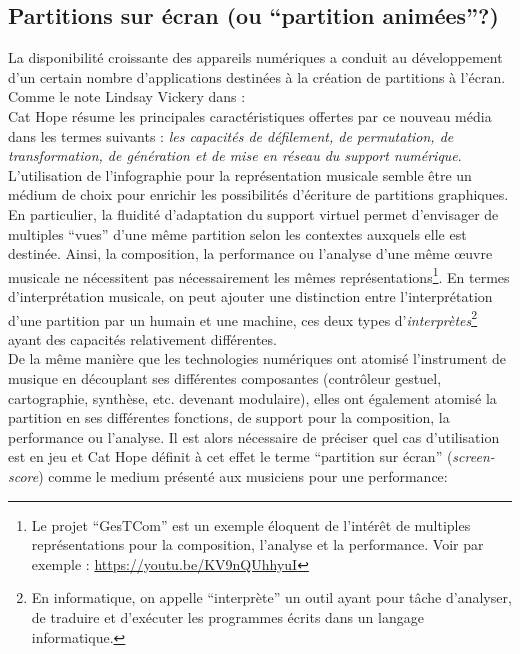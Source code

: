\subsection{Partitions sur écran (ou ``partition animées''?)}

\noindent La disponibilité croissante des appareils numériques a conduit au développement d'un certain nombre d'applications destinées à la création de partitions à l'écran. Comme le note Lindsay Vickery dans \cite{vickery_limitations_2014} : \\
\indent Cat Hope résume les principales caractéristiques offertes par ce nouveau média dans les termes suivants \cite{hope_screen_2011}: \textit{les capacités de défilement, de permutation, de transformation, de génération et de mise en réseau du support numérique}.\\
\indent L'utilisation de l'infographie pour la représentation musicale semble être un médium de choix pour enrichir les possibilités d'écriture de partitions graphiques. En particulier, la fluidité d'adaptation du support virtuel permet d'envisager de multiples ``vues'' d'une même partition selon les contextes auxquels elle est destinée. Ainsi, la composition, la performance ou l'analyse d'une même œuvre musicale ne nécessitent pas nécessairement les mêmes représentations\footnote{Le projet ``GesTCom'' \cite{antoniadis_gesture_2014} est un exemple éloquent de l'intérêt de multiples représentations pour la composition, l'analyse et la performance. Voir par exemple : \url{https://youtu.be/KV9nQUhhyuI}}. En termes d'interprétation musicale, on peut ajouter une distinction entre l'interprétation d'une partition par un humain et une machine, ces deux types d'\textit{interprètes}\footnote{En informatique, on appelle ``interprète'' un outil ayant pour tâche d'analyser, de traduire et d'exécuter les programmes écrits dans un langage informatique.} ayant des capacités relativement différentes.\\
\indent De la même manière que les technologies numériques ont atomisé l'instrument de musique en découplant ses différentes composantes (contrôleur gestuel, cartographie, synthèse, etc. devenant modulaire), elles ont également atomisé la partition en ses différentes fonctions, de support pour la composition, la performance ou l'analyse. Il est alors nécessaire de préciser quel cas d'utilisation est en jeu et Cat Hope définit à cet effet le terme ``partition sur écran'' (\textit{screen-score}) \cite{hope_screen_2011} comme le medium présenté aux musiciens pour une performance: \\
